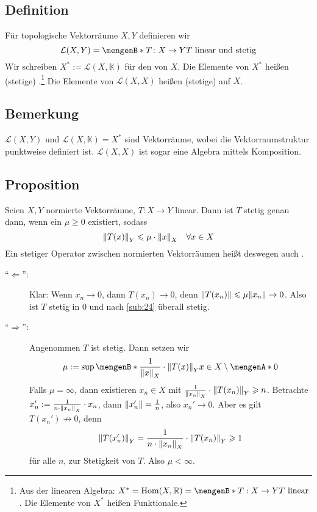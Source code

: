 \subsection[Definition: Stetige Funktionale und Operatoren]{Definition} %
\label{sub:25}
Für topologische Vektorräume $X,Y$ definieren wir 
\[
	\mathcal{L}(X,Y) = \set[T \colon X \to Y]{T \text{ linear und stetig}}  
\]
Wir schreiben $X^*:= \mathcal{L}(X,\mathds{K})$ für den  von $X$. Die Elemente von $X^*$ heißen (stetige) .\footnote{Aus der linearen Algebra: $X^* = \Hom(X,\mathds{R}) = \set[T : X \to Y]{T \text{ linear}}$. Die Elemente von $X^*$ heißen Funktionale.}
Die Elemente von $\mathcal{L}(X,X)$ heißen (stetige)  auf $X$. 

\subsection[Bemerkung: Vektorraumstruktur auf $\mathcal{L}(X,Y)$, Algebrastruktur auf $\mathcal{L}(X,X)$]{Bemerkung} %
\label{sub:26}
$\mathcal{L}(X,Y)$ und $\mathcal{L}(X,\mathds{K}) = X^*$ sind Vektorräume, wobei die Vektorraumstruktur punktweise definiert ist. $\mathcal{L}(X,X)$ ist sogar eine Algebra mittels Komposition.

\subsection[Proposition: Stetigkeit linearer Abbildungen mittels Normabschätzung]{Proposition} %
\label{sub:27}
Seien $X,Y$ normierte Vektorräume, $T \colon X \to Y$ linear. Dann ist $T$ stetig genau dann, wenn ein $\mu \ge 0$ existiert, sodass 
\[
	\norm[Y]{T(x)} \le \mu \cdot \norm[X]{x} \quad \forall x \in X  
\]
Ein stetiger Operator zwischen normierten Vektorräumen heißt deswegen auch .
\begin{description}
	\item[\enquote{$\Leftarrow$}:] Klar: Wenn $x_n \to 0$, dann $T(x_n) \to 0$, denn $\norm{T(x_n)} \le \mu \norm{x_n } \to 0$. Also ist $T$ stetig in $0$ und nach
	\ref{sub:24} überall stetig.
	\item[\enquote{$\Rightarrow $}:] Angenommen $T$ ist stetig. Dann setzen wir
	\[
		\mu := \sup \set[{\frac{1}{\norm[X]{x}} \cdot \norm[Y]{T(x)}  }]{x \in X \setminus \set{0} } 
	\] 
	Falls $\mu = \infty$, dann existieren $x_n \in X$ mit $\frac{1}{\norm[X]{x_n}} \cdot \norm[Y]{T(x_n)} \ge n$. Betrachte 
	$x_n' :=  \frac{1}{n \cdot \norm[X]{x_n}} \cdot x_n $, dann $\norm{x_n'} = \frac{1}{n}$, also $x_n' \to 0$. Aber es gilt $T(x_n')\not\longrightarrow 0$, denn
	\begin{align*}
		\norm[Y]{T(x_n')} = \frac{1}{n \cdot \norm[X]{x_n} } \cdot \norm[Y]{T(x_n)} \ge 1 
	\end{align*}
	für alle $n$, \light zur Stetigkeit von $T$. Also $\mu < \infty$. \bewende 
\end{description}

